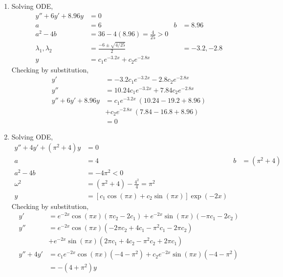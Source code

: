 \begin{enumerate}
    \item Solving ODE,
          \begin{align}
              y'' + 6y' + 8.96y        & = 0                                                  \\
              a                        & = 6                               & b & = 8.96       \\
              a^{2} - 4b               & = 36 - 4(8.96) = \frac{4}{25} > 0                    \\
              \lambda_{1}, \lambda_{2} & = \frac{-6 \pm \sqrt{4/25}}{2}    &   & = -3.2, -2.8 \\
              y                        & = c_{1}e^{-3.2x} + c_{2}e^{-2.8x}
          \end{align}
          Checking by substitution,
          \begin{align}
              y'                & = -3.2c_{1}e^{-3.2x} - 2.8c_{2}e^{-2.8x}   \\
              y''               & = 10.24c_{1}e^{-3.2x} + 7.84c_{2}e^{-2.8x} \\
              y'' + 6y' + 8.96y & = c_{1}e^{-3.2x}\ (10.24 - 19.2 + 8.96)    \\
                                & + c_{2}e^{-2.8x}\ (7.84 - 16.8 + 8.96)     \\
                                & = 0
          \end{align}

    \item Solving ODE,
          \begin{align}
              y'' + 4y' + (\pi^{2} + 4)y & = 0                                                                     \\
              a                          & = 4                                               & b & = (\pi^{2} + 4) \\
              a^{2} - 4b                 & = -4\pi ^{2} < 0                                                        \\
              \omega^{2}                 & = (\pi ^{2} + 4) - \frac{4^{2}}{4} = \pi ^{2}                           \\
              y                          & = [c_{1}\cos(\pi x) + c_{2}\sin(\pi x)] \exp(-2x)
          \end{align}
          Checking by substitution,
          \begin{align}
              y'        & = e^{-2x}\cos(\pi x) (\pi c_{2} - 2c_{1}) + e^{-2x}\sin(\pi x)(-\pi c_{1} - 2c_{2}) \\
              y''       & = e^{-2x}\cos(\pi x)(-2\pi c_{2} + 4c_{1} - \pi ^{2}c_{1} - 2\pi c_{2})             \\
                        & + e^{-2x}\sin(\pi x)(2\pi c_{1} + 4c_{2} - \pi ^{2}c_{2} + 2\pi c_{1})              \\
              y'' + 4y' & = c_{1}e^{-2x}\cos(\pi x)(-4-\pi ^{2}) + c_{2}e^{-2x}\sin(\pi x)(-4-\pi ^{2})       \\
                        & = -(4 + \pi ^{2})y
          \end{align}


\end{enumerate}
